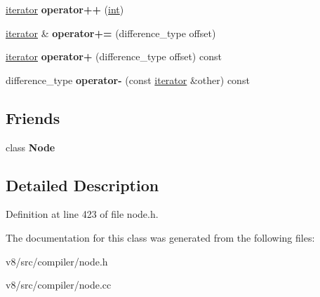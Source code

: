 \begin{DoxyCompactItemize}
\mbox{\hyperlink{classv8_1_1internal_1_1compiler_1_1Node_1_1InputEdges_1_1iterator}{iterator}} {\bfseries operator++} (\mbox{\hyperlink{classint}{int}})
\item 
\mbox{\label{classv8_1_1internal_1_1compiler_1_1Node_1_1InputEdges_1_1iterator_a4b611981f0336b0c1a7632b61ac2ef36}} 
\mbox{\hyperlink{classv8_1_1internal_1_1compiler_1_1Node_1_1InputEdges_1_1iterator}{iterator}} \& {\bfseries operator+=} (difference\+\_\+type offset)
\item 
\mbox{\label{classv8_1_1internal_1_1compiler_1_1Node_1_1InputEdges_1_1iterator_abe2441e8ecb42ec6df1731f8fb7105df}} 
\mbox{\hyperlink{classv8_1_1internal_1_1compiler_1_1Node_1_1InputEdges_1_1iterator}{iterator}} {\bfseries operator+} (difference\+\_\+type offset) const
\item 
\mbox{\label{classv8_1_1internal_1_1compiler_1_1Node_1_1InputEdges_1_1iterator_af2736ac9cb4e7c57b3b4c5f1d7dfa3b4}} 
difference\+\_\+type {\bfseries operator-\/} (const \mbox{\hyperlink{classv8_1_1internal_1_1compiler_1_1Node_1_1InputEdges_1_1iterator}{iterator}} \&other) const
\end{DoxyCompactItemize}
\subsection*{Friends}
\begin{DoxyCompactItemize}
\item 
\mbox{\label{classv8_1_1internal_1_1compiler_1_1Node_1_1InputEdges_1_1iterator_a6db9d28bd448a131448276ee03de1e6d}} 
class {\bfseries Node}
\end{DoxyCompactItemize}


\subsection{Detailed Description}


Definition at line 423 of file node.\+h.



The documentation for this class was generated from the following files\+:\begin{DoxyCompactItemize}
\item 
v8/src/compiler/node.\+h\item 
v8/src/compiler/node.\+cc\end{DoxyCompactItemize}
